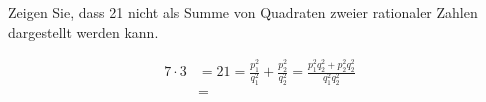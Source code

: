 
\begin{exercise}[Fermat]

Zeigen Sie, dass 21 nicht als Summe von Quadraten zweier rationaler Zahlen
dargestellt werden kann.

\end{exercise}


\begin{solution}

\begin{align*}
    7 \cdot 3 &= 21 = \frac{p_1^2}{q_1^2} + \frac{p_2^2}{q_2^2}
    = \frac{p_1^2q_2^2 + p_2^2q_2^2}{q_1^2q_2^2} \\
    &=
\end{align*}

\end{solution}

